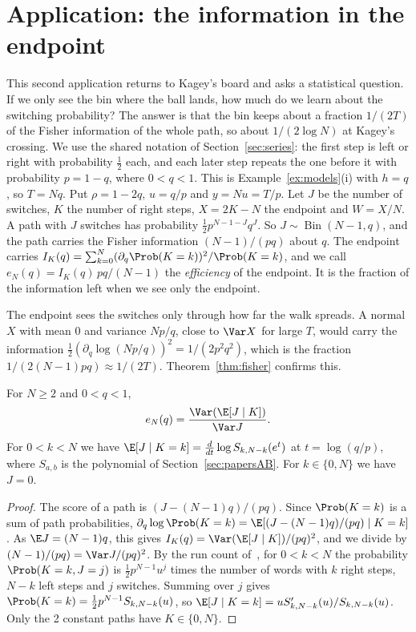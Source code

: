 \section{Application: the information in the endpoint}\label{sec:fisher}

This second application returns to Kagey's board and asks a statistical
question. If we only see the bin where the ball lands, how much do we learn
about the switching probability? The answer is that the bin keeps about a
fraction $1/(2T)$ of the Fisher information of the whole path, so about
$1/(2\log N)$ at Kagey's crossing. We use the shared notation of
Section~\ref{sec:series}: the first step is left or right with probability
$\frac12$ each, and each later step repeats the one before it with probability
$p=1-q$, where $0<q<1$. This is Example~\ref{ex:models}(i) with $h=q$, so
$T=Nq$. Put $\rho=1-2q$, $u=q/p$ and $y=Nu=T/p$. Let $J$ be the number of
switches, $K$ the number of right steps, $X=2K-N$ the endpoint and $W=X/N$. A path with $J$ switches has probability
$\frac12p^{N-1-J}q^J$. So $J\sim\operatorname{Bin}(N-1,q)$, and the path
carries the Fisher information $(N-1)/(pq)$ about $q$. The endpoint carries
$I_K(q)=\sum_{k=0}^N(\partial_q\Prob(K=k))^2/\Prob(K=k)$, and we call
$e_N(q)=I_K(q)\,pq/(N-1)$ the \emph{efficiency} of the endpoint. It is the
fraction of the information left when we see only the endpoint.

The endpoint sees the switches only through how far the walk spreads. A
normal $X$ with mean $0$ and variance $Np/q$, close to $\Var X$ for large
$T$, would carry the information $\frac12(\partial_q\log(Np/q))^2=1/(2p^2q^2)$,
which is the fraction $1/(2(N-1)pq)\approx1/(2T)$. Theorem~\ref{thm:fisher}
confirms this.

\begin{proposition}\label{prop:eta}
For $N\ge2$ and $0<q<1$,
\[
 e_N(q)=\frac{\Var(\E[J\mid K])}{\Var J}.
\]
For $0<k<N$ we have $\E[J\mid K=k]=\frac{d}{dt}\log S_{k,N-k}(e^t)$ at
$t=\log(q/p)$, where $S_{a,b}$ is the polynomial of
Section~\ref{sec:papersAB}. For $k\in\{0,N\}$ we have $J=0$.
\end{proposition}

\begin{proof}
The score of a path is $(J-(N-1)q)/(pq)$. Since $\Prob(K=k)$ is a sum of path
probabilities, $\partial_q\log\Prob(K=k)=\E[(J-(N-1)q)/(pq)\mid K=k]$. As
$\E J=(N-1)q$, this gives $I_K(q)=\Var(\E[J\mid K])/(pq)^2$, and we divide by
$(N-1)/(pq)=\Var J/(pq)^2$. By the run count of~\cite{paperA}, for $0<k<N$
the probability $\Prob(K=k,J=j)$ is $\frac12p^{N-1}u^j$ times the number of
words with $k$ right steps, $N-k$ left steps and $j$ switches. Summing over
$j$ gives $\Prob(K=k)=\frac12p^{N-1}S_{k,N-k}(u)$, so
$\E[J\mid K=k]=uS'_{k,N-k}(u)/S_{k,N-k}(u)$. Only the 2 constant paths have
$K\in\{0,N\}$.
\end{proof}

